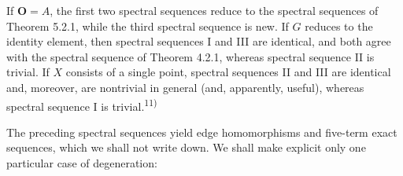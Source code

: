 If ${\mathbf O}=A$, the first two spectral sequences reduce to the spectral sequences
of Theorem 5.2.1, while the third spectral sequence is new. If $G$ reduces to
the identity element, then spectral sequences I and III are identical, and
both agree with the spectral sequence of Theorem 4.2.1, whereas spectral
sequence II is trivial. If $X$ consists of a single point, spectral sequences
II and III are identical and, moreover, are nontrivial in general (and,
apparently, useful), whereas spectral sequence I is
trivial.\textsuperscript{11)}

The preceding spectral sequences yield edge homomorphisms and five-term exact
sequences, which we shall not write down.
We shall make explicit only one particular case of degeneration:

